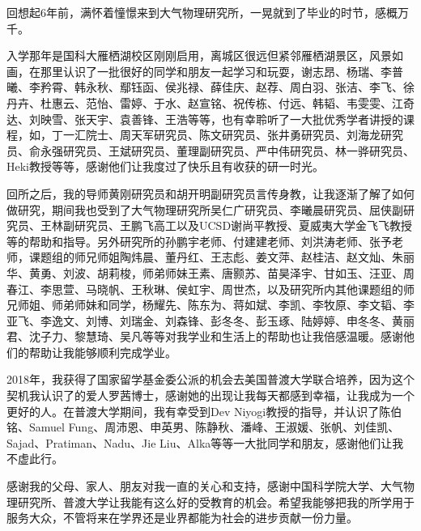 回想起6年前，满怀着憧憬来到大气物理研究所，一晃就到了毕业的时节，感概万千。

入学那年是国科大雁栖湖校区刚刚启用，离城区很远但紧邻雁栖湖景区，风景如画，在那里认识了一批很好的同学和朋友一起学习和玩耍，谢志昂、杨瑞、李普曦、李矜霄、韩永秋、鄢钰函、侯兆禄、薛佳庆、赵荐、周白羽、张洁、李飞、徐丹卉、杜惠云、范怡、雷婷、于水、赵宣铭、祝传栋、付远、韩韬、韦雯雯、江奇达、刘映雪、张天宇、袁善锋、王浩等等，也有幸聆听了一大批优秀学者讲授的课程，如，丁一汇院士、周天军研究员、陈文研究员、张井勇研究员、刘海龙研究员、俞永强研究员、王斌研究员、董理副研究员、严中伟研究员、林一骅研究员、Heki教授等等，感谢他们让我度过了快乐且有收获的研一时光。

回所之后，我的导师黄刚研究员和胡开明副研究员言传身教，让我逐渐了解了如何做研究，期间我也受到了大气物理研究所吴仁广研究员、李曦晨研究员、屈侠副研究员、王林副研究员、王鹏飞高工以及UCSD谢尚平教授、夏威夷大学金飞飞教授等的帮助和指导。另外研究所的孙鹏宇老师、付建建老师、刘洪涛老师、张予老师，课题组的师兄师姐陶炜晨、董丹红、王志彪、姜文萍、赵桂洁、赵文灿、朱丽华、黄勇、刘波、胡莉梭，师弟师妹王素、唐颢苏、苗昊泽宇、甘如玉、汪亚、周春江、李思萱、马晓帆、王秋琳、侯虹宇、周世杰，以及研究所内其他课题组的师兄师姐、师弟师妹和同学，杨耀先、陈东为、蒋如斌、李凯、李牧原、李文韬、李亚飞、李逸文、刘博、刘瑞金、刘森锋、彭冬冬、彭玉琢、陆婷婷、申冬冬、黄丽君、沈子力、黎慧琦、吴凡等等对我学业和生活上的帮助也让我倍感温暖。感谢他们的帮助让我能够顺利完成学业。

2018年，我获得了国家留学基金委公派的机会去美国普渡大学联合培养，因为这个契机我认识了的爱人罗茜博士，感谢她的出现让我每天都感到幸福，让我成为一个更好的人。在普渡大学期间，我有幸受到Dev Niyogi教授的指导，并认识了陈伯铭、Samuel Fung、周沛恩、申英男、陈静秋、潘峰、王淑媛、张帆、刘佳凯、Sajad、Pratiman、Nadu、Jie Liu、Alka等等一大批同学和朋友，感谢他们让我不虚此行。

感谢我的父母、家人、朋友对我一直的关心和支持，感谢中国科学院大学、大气物理研究所、普渡大学让我能有这么好的受教育的机会。希望我能够把我的所学用于服务大众，不管将来在学界还是业界都能为社会的进步贡献一份力量。


\cleardoublepage[plain]%
